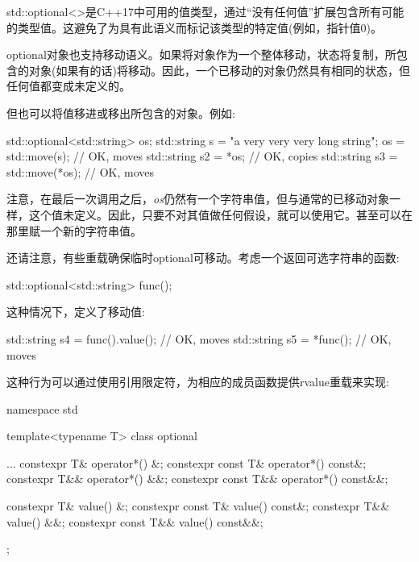 
std::\allowbreak{}optional<\allowbreak{}>是C++17中可用的值类型，通过“没有任何值”扩展包含所有可能的类型值。这避免了为具有此语义而标记该类型的特定值(例如，指针值0)。\par

optional对象也支持移动语义。如果将对象作为一个整体移动，状态将复制，所包含的对象(如果有的话)将移动。因此，一个已移动的对象仍然具有相同的状态，但任何值都变成未定义的。\par

但也可以将值移进或移出所包含的对象。例如:\par

\begin{codebox}[cpp]
std::optional<std::string> os;
std::string s = "a very very very long string";
os = std::move(s); // OK, moves
std::string s2 = *os; // OK, copies
std::string s3 = std::move(*os); // OK, moves
\end{codebox}

注意，在最后一次调用之后，\textit{os}仍然有一个字符串值，但与通常的已移动对象一样，这个值未定义。因此，只要不对其值做任何假设，就可以使用它。甚至可以在那里赋一个新的字符串值。\par

还请注意，有些重载确保临时optional可移动。考虑一个返回可选字符串的函数:\par

\begin{codebox}[cpp]
std::optional<std::string> func();
\end{codebox}

这种情况下，定义了移动值:\par

\begin{codebox}[cpp]
std::string s4 = func().value(); // OK, moves
std::string s5 = *func(); // OK, moves
\end{codebox}

这种行为可以通过使用引用限定符，为相应的成员函数提供rvalue重载来实现:\par

\begin{codebox}[cpp]
namespace std {
  template<typename T>
  class optional {
    ...
    constexpr T& operator*() &;
    constexpr const T& operator*() const&;
    constexpr T&& operator*() &&;
    constexpr const T&& operator*() const&&;

    constexpr T& value() &;
    constexpr const T& value() const&;
    constexpr T&& value() &&;
    constexpr const T&& value() const&&;
  };
}
\end{codebox}

